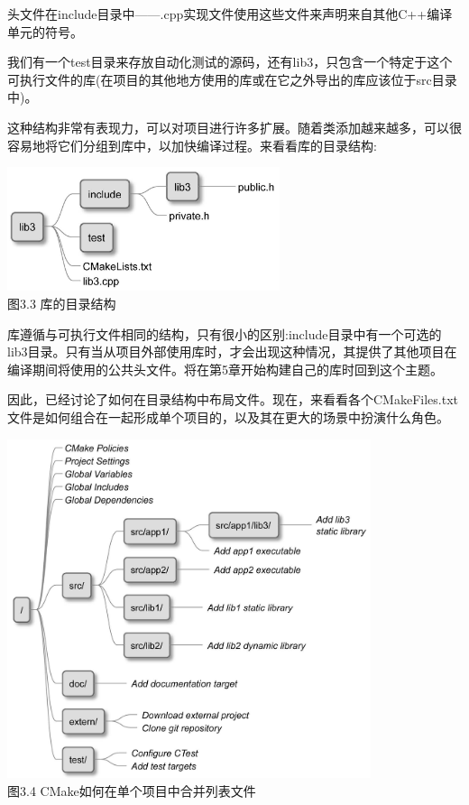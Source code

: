 头文件在include目录中——.cpp实现文件使用这些文件来声明来自其他C++编译单元的符号。

我们有一个test目录来存放自动化测试的源码，还有lib3，只包含一个特定于这个可执行文件的库(在项目的其他地方使用的库或在它之外导出的库应该位于src目录中)。

这种结构非常有表现力，可以对项目进行许多扩展。随着类添加越来越多，可以很容易地将它们分组到库中，以加快编译过程。来看看库的目录结构:

\begin{center}
\includegraphics[width=0.6\textwidth]{content/1/chapter3/images/3.jpg}\\
图3.3 库的目录结构
\end{center}

库遵循与可执行文件相同的结构，只有很小的区别:include目录中有一个可选的lib3目录。只有当从项目外部使用库时，才会出现这种情况，其提供了其他项目在编译期间将使用的公共头文件。将在第5章开始构建自己的库时回到这个主题。

因此，已经讨论了如何在目录结构中布局文件。现在，来看看各个CMakeFiles.txt文件是如何组合在一起形成单个项目的，以及其在更大的场景中扮演什么角色。

\begin{center}
\includegraphics[width=0.8\textwidth]{content/1/chapter3/images/4.jpg}\\
图3.4 CMake如何在单个项目中合并列表文件
\end{center}


